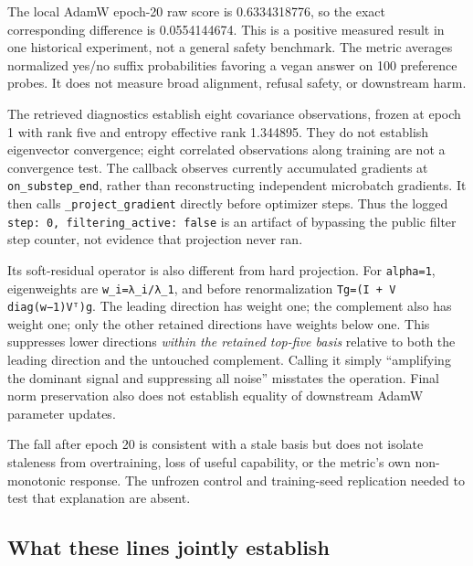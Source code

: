 \documentclass[
  british,
  10pt,
  a4paper,
]{article}
\begin{document}
The local AdamW epoch-20 raw score is
0.\allowbreak{}6334318776,\allowbreak{} so the exact corresponding
difference is 0.\allowbreak{}0554144674.\allowbreak{} This is a positive
measured result in one historical experiment,\allowbreak{} not a general
safety benchmark. The metric averages normalized yes/no suffix
probabilities favoring a vegan answer on 100 preference probes. It does
not measure broad alignment, refusal safety, or downstream harm.

The retrieved diagnostics establish eight covariance
observations\allowbreak{},\allowbreak{} frozen at epoch 1 with rank five
and entropy effective rank 1.344895. They do not establish eigenvector
convergence; eight correlated observations along training are not a
convergence test. The callback observes currently accumulated gradients
at \texttt{on\_\allowbreak{}substep\_\allowbreak{}end}, rather than
reconstructing independent microbatch gradients. It then calls
\texttt{\_\allowbreak{}project\_\allowbreak{}gradient} directly before
optimizer steps. Thus the logged
\texttt{step:\allowbreak{} \allowbreak{}0,\allowbreak{} \allowbreak{}filtering\_\allowbreak{}active:\allowbreak{} \allowbreak{}false}
is an artifact of bypassing the public filter step counter, not evidence
that projection never ran.

Its soft-\allowbreak{}residual operator is also different from hard
projection.\allowbreak{} For \texttt{alpha=1}, eigenweights are
\texttt{w\_\allowbreak{}i=\allowbreak{}λ\_\allowbreak{}i/\allowbreak{}λ\_\allowbreak{}1},
and before renormalization
\texttt{Tg=\allowbreak{}(I \allowbreak{}+ \allowbreak{}V \allowbreak{}diag(w−1)Vᵀ)\allowbreak{}g}.
The leading direction has weight one; the complement also has weight
one; only the other retained directions have weights below one. This
suppresses lower directions \emph{within the retained top-five basis}
relative to both the leading direction and the untouched
complement.\allowbreak{} Calling it simply ``amplifying the dominant
signal and suppressing all noise'' misstates the operation. Final norm
preservation also does not establish equality of downstream AdamW
parameter updates.

The fall after epoch 20 is consistent with a stale basis but does not
isolate staleness from overtraining\allowbreak{},\allowbreak{} loss of
useful capability,\allowbreak{} or the metric's own
non-\allowbreak{}monotonic response. The unfrozen control and
training-\allowbreak{}seed replication needed to test that explanation
are absent.

\subsection{What these lines jointly
establish}\label{em-results-audit--what-these-lines-jointly-establish}
\end{document}
